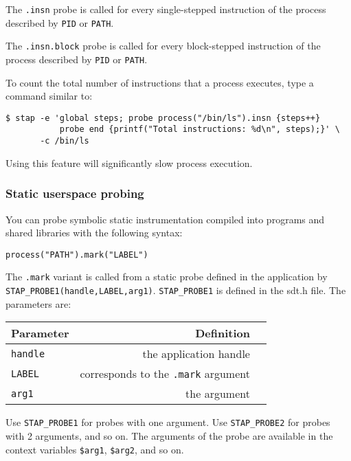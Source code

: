 \documentclass[twoside,english]{article}
\newenvironment{vindent}
{\begin{list}{}{\setlength{\listparindent}{6pt}}
\item[]}
{\end{list}}
\begin{document}
The \texttt{.insn} probe is called for every single-stepped
instruction of the process described by \texttt{PID} or \texttt{PATH}.

The \texttt{.insn.block} probe is called for every block-stepped
instruction of the process described by \texttt{PID} or \texttt{PATH}.

To count the total number of instructions that a process executes,
type a command similar to:
\begin{vindent}
\begin{verbatim}
$ stap -e 'global steps; probe process("/bin/ls").insn {steps++}
           probe end {printf("Total instructions: %d\n", steps);}' \
       -c /bin/ls
\end{verbatim}
\end{vindent}

Using this feature will significantly slow process execution.

\subsubsection{Static userspace probing}
\label{sec:staticuserspace}
You can probe symbolic static instrumentation compiled into programs
and shared libraries with the following syntax:
\begin{vindent}
\begin{verbatim}
process("PATH").mark("LABEL")
\end{verbatim}
\end{vindent}

The \texttt{.mark} variant is called from a static probe defined in
the application by
\texttt{STAP\_PROBE1(handle,LABEL,arg1)}. \texttt{STAP\_PROBE1} is
defined in the sdt.h file.  The parameters are:


\begin{tabular}{|l|r|c|}
  Parameter & Definition \\ \hline
  \texttt{handle} & the application handle \\ \hline
  \texttt{LABEL} & corresponds to the \texttt{.mark} argument \\ \hline
  \texttt{arg1} & the argument \\ \hline
\end{tabular}


Use \texttt{STAP\_PROBE1} for probes with one argument.  Use
\texttt{STAP\_PROBE2} for probes with 2 arguments, and so on.  The
arguments of the probe are available in the context variables
\texttt{\$arg1}, \texttt{\$arg2}, and so on.
\end{document}
